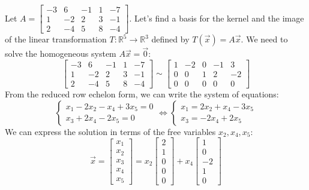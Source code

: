 \begin{eg}
    Let $A = \begin{bmatrix}
        -3 & 6 & -1 & 1 & -7 \\
        1 & -2 & 2 & 3 & -1 \\
        2 & -4 & 5 & 8 & -4
    \end{bmatrix}$. Let's find a basis for the kernel and the image of the linear transformation $T: \mathbb{R}^5 \to \mathbb{R}^3$ defined by $T(\vec{x}) = A\vec{x}$. We need to solve the homogeneous system $A\vec{x} = \vec{0}$:
    \[ \begin{bmatrix}
        -3 & 6 & -1 & 1 & -7 \\
        1 & -2 & 2 & 3 & -1 \\
        2 & -4 & 5 & 8 & -4
    \end{bmatrix} \sim \begin{bmatrix}
        1 & -2 & 0 & -1 & 3 \\
        0 & 0 & 1 & 2 & -2 \\
        0 & 0 & 0 & 0 & 0
    \end{bmatrix} \]
    From the reduced row echelon form, we can write the system of equations:
    \[
        \begin{cases}
            x_1 - 2x_2 - x_4 + 3x_5 = 0 \\
            x_3 + 2x_4 - 2x_5 = 0
        \end{cases} \iff \begin{cases}
            x_1 = 2x_2 + x_4 - 3x_5 \\
            x_3 = -2x_4 + 2x_5
        \end{cases}
    \]
    We can express the solution in terms of the free variables $x_2, x_4, x_5$:
    \[ \vec{x} = \begin{bmatrix}
        x_1 \\ x_2 \\ x_3 \\ x_4 \\ x_5
    \end{bmatrix} = x_2 \begin{bmatrix}
        2 \\ 1 \\ 0 \\ 0 \\ 0
    \end{bmatrix} + x_4 \begin{bmatrix}
        1 \\ 0 \\ -2 \\ 1 \\ 0

\end{bmatrix}\]
\end{eg}
